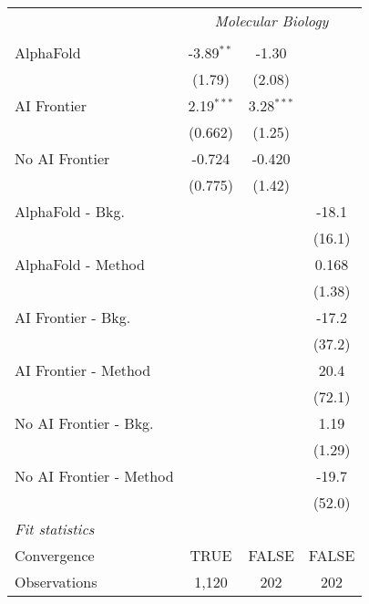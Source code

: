 \begin{tabular}{lccc}
 & \multicolumn{3}{c}{\textit{Molecular Biology}} \\ \\
   AlphaFold               & -3.89$^{**}$ & -1.30        &   \\   
                           & (1.79)       & (2.08)       &   \\   
   AI Frontier             & 2.19$^{***}$ & 3.28$^{***}$ &   \\   
                           & (0.662)      & (1.25)       &   \\   
   No AI Frontier          & -0.724       & -0.420       &   \\   
                           & (0.775)      & (1.42)       &   \\   
   AlphaFold - Bkg.        &              &              & -18.1\\   
                           &              &              & (16.1)\\   
   AlphaFold - Method      &              &              & 0.168\\   
                           &              &              & (1.38)\\   
   AI Frontier - Bkg.      &              &              & -17.2\\   
                           &              &              & (37.2)\\   
   AI Frontier - Method    &              &              & 20.4\\   
                           &              &              & (72.1)\\   
   No AI Frontier - Bkg.   &              &              & 1.19\\   
                           &              &              & (1.29)\\   
   No AI Frontier - Method &              &              & -19.7\\   
                           &              &              & (52.0)\\   
   \midrule
   \emph{Fit statistics}\\
   Convergence             &TRUE          & FALSE        & FALSE\\  
   Observations            & 1,120        & 202          & 202\\  
   

\end{tabular}
